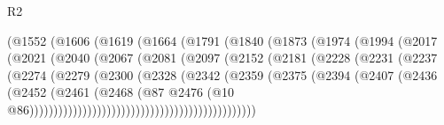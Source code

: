 \begin{lexlean}{R2}
\begin{coremodule}
                            (@1552
                              (@1606
                                (@1619
                                  (@1664
                                    (@1791
                                      (@1840
                                        (@1873
                                          (@1974
                                            (@1994
                                              (@2017
                                                (@2021
                                                  (@2040
                                                    (@2067
                                                      (@2081
                                                        (@2097
                                                          (@2152
                                                            (@2181
                                                              (@2228
                                                                (@2231
                                                                  (@2237
                                                                    (@2274
                                                                      (@2279
                                                                        (@2300
                                                                          (@2328
                                                                            (@2342
                                                                              (@2359
                                                                                (@2375
                                                                                  (@2394
                                                                                    (@2407
                                                                                      (@2436
                                                                                        (@2452
                                                                                          (@2461
                                                                                            (@2468
                                                                                              (@87
                                                                                                @2476
                                                                                                (@10
                                                                                                  @86)))))))))))))))))))))))))))))))))))))))))))))))

\end{coremodule}
\end{lexlean}
